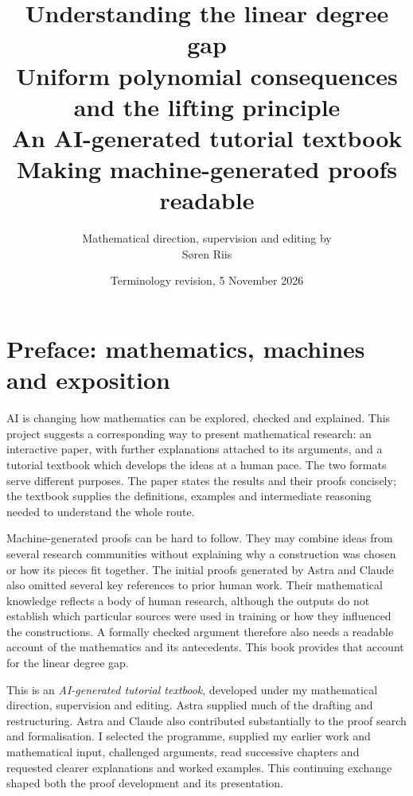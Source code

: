 \documentclass[11pt,a4paper,oneside,openany]{book}
\title{Understanding the linear degree gap\\[8pt]
\Large Uniform polynomial consequences and the lifting principle\\[10pt]
\large An AI-generated tutorial textbook\\[4pt]
\normalsize Making machine-generated proofs readable}
\author{\normalsize Mathematical direction, supervision and editing by\\[4pt]
\large S\o ren Riis}
\date{Terminology revision, 5 November 2026}
\theoremstyle{definition}\newtheorem{definition}[theorem]{Definition}
\theoremstyle{remark}\newtheorem{remark}[theorem]{Remark}
\numberwithin{equation}{chapter}
\begin{document}
\frontmatter
\hypersetup{pageanchor=false}
\maketitle
\hypersetup{pageanchor=true}

\chapter*{Preface: mathematics, machines and exposition}
\label{tx:preface:provenance}
\begingroup\fontsize{10.5}{12.6}\selectfont
AI is changing how mathematics can be explored, checked and explained.
This project suggests a corresponding way to present mathematical research:
an interactive paper, with further explanations attached to its arguments,
and a tutorial textbook which develops the ideas at a human pace.
The two formats serve different purposes. The paper states the results
and their proofs concisely; the textbook supplies the definitions,
examples and intermediate reasoning needed to understand the whole route.

Machine-generated proofs can be hard to follow. They may combine ideas
from several research communities without explaining why a construction
was chosen or how its pieces fit together. The initial proofs generated
by Astra and Claude also omitted several key references to prior human
work. Their mathematical knowledge reflects a body of human research,
although the outputs do not establish which particular sources were
used in training or how they influenced the constructions. A formally
checked argument therefore also needs a readable account of the
mathematics and its antecedents. This book provides that account for
the linear degree gap.

This is an \emph{AI-generated tutorial textbook}, developed under my
mathematical direction, supervision and editing. Astra supplied much of
the drafting and restructuring. Astra and Claude also contributed
substantially to the proof search and formalisation. I selected the
programme, supplied my earlier work and mathematical input, challenged
arguments, read successive chapters and requested clearer explanations
and worked examples. This continuing exchange shaped both the proof
development and its presentation.
\end{document}
